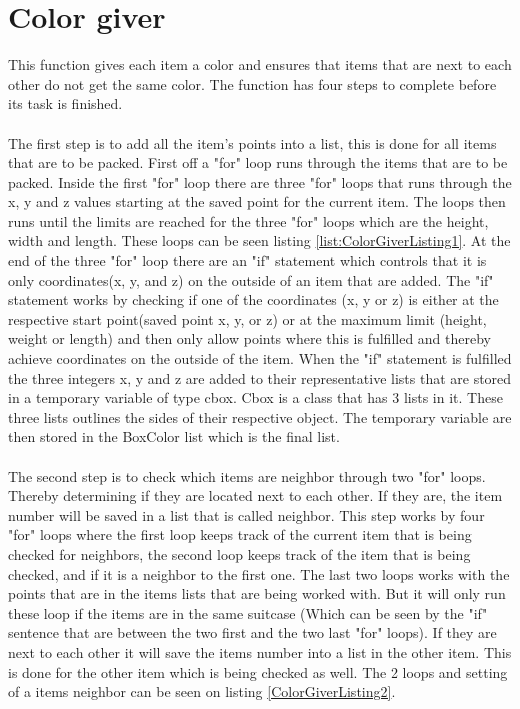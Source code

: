 \section{Color giver}
This function gives each item a color and ensures that items that are next to each other do not get the same color. The function has four steps to complete before its task is finished.\\
\\
The first step is to add all the item's points into a list, this is done for all items that are to be packed. First off a "for" loop runs through the items that are to be packed. Inside the first "for" loop there are three "for" loops that runs through the x, y and z values starting at the saved point for the current item. The loops then runs until the limits are reached for the three "for" loops which are the height, width and length. These loops can be seen listing \ref{list:ColorGiverListing1}. At the end of the three "for" loop there are an "if" statement which controls that it is only coordinates(x, y, and z) on the outside of an item that are added. The "if" statement works by checking if one of the coordinates (x, y or z) is either at the respective start point(saved point x, y, or z) or at the maximum limit (height, weight or length) and then only allow points where this is fulfilled and thereby achieve coordinates on the outside of the item.
When the "if" statement is fulfilled the three integers x, y and z are added to their representative lists that are stored in a temporary variable of type cbox. Cbox is a class that has 3 lists in it. These three lists outlines the sides of their respective object. The temporary variable are then stored in the BoxColor list which is the final list.\\ 
\\
The second step is to check which items are neighbor through two "for" loops. Thereby determining if they are located next to each other. If they are, the item number will be saved in a list that is called neighbor. This step works by four "for" loops where the first loop keeps track of the current item that is being checked for neighbors, the second loop keeps track of the item that is being checked, and if it is a neighbor to the first one. The last two loops works with the points that are in the items lists that are being worked with. But it will only run these loop if the items are in the same suitcase (Which can be seen by the "if" sentence that are between the two first and the two last "for" loops). If they are next to each other it will save the items number into a list in the other item. This is done for the other item which is being checked as well. The 2 loops and setting of a items neighbor can be seen on listing \ref{ColorGiverListing2}.\\
